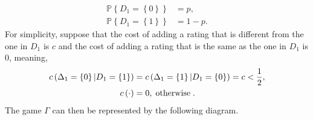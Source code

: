 \documentclass{article}
\begin{document}
\begin{align*}
\mathbb{P}\left\{D_{1} = \left\{0\right\}\right\} &= p, 
\\ \mathbb{P}\left\{D_{1} = \left\{1\right\}\right\} &= 1 - p. 
\end{align*}
For simplicity, suppose that the cost of adding a rating that is different from the one in $D_{1}$ is $c $ and the cost of adding a rating that is the same as the one in $D_{1}$ is $0$, meaning,
\begin{align*}
c\left(\Delta_{1} = \left\{0\right\} | D_{1} = \left\{1\right\}\right)  &= c\left(\Delta_{1} = \left\{1\right\} | D_{1} = \left\{0\right\}\right)  = c  < \dfrac{1}{2} ,
\\ c\left(\cdot \right)  &= 0, \text{\;otherwise\;}.
\end{align*}
The game $\Gamma$ can then be represented by the following diagram.
\newline \newline
\end{document}
